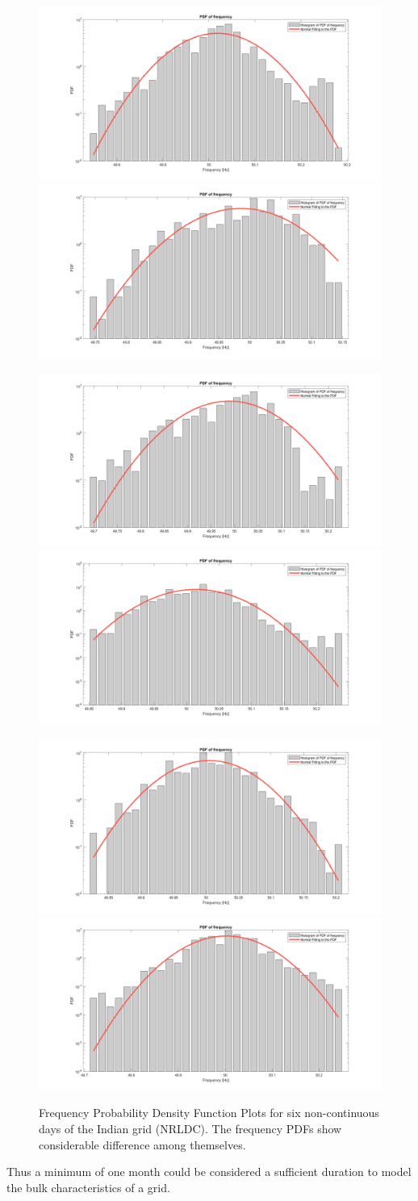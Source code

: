 \begin{figure}[htp]
	\centering
	\includegraphics[width=.45\textwidth]{../figures/pdf/nrldc/pdf_frequency_nrldc_01}\quad
	\includegraphics[width=.45\textwidth]{../figures/pdf/nrldc/pdf_frequency_nrldc_02}
	
	\medskip
	
	\includegraphics[width=.45\textwidth]{../figures/pdf/nrldc/pdf_frequency_nrldc_03}\quad
	\includegraphics[width=.45\textwidth]{../figures/pdf/nrldc/pdf_frequency_nrldc_04}
	
	\medskip
	
	\includegraphics[width=.45\textwidth]{../figures/pdf/nrldc/pdf_frequency_nrldc_05}\quad
	\includegraphics[width=.45\textwidth]{../figures/pdf/nrldc/pdf_frequency_nrldc_06}
	
	\caption{Frequency Probability Density Function Plots for six non-continuous days of the Indian grid (NRLDC). The frequency PDFs show considerable difference among themselves.}
\end{figure}

Thus a minimum of one month could be considered a sufficient duration to model the bulk characteristics of a grid.


